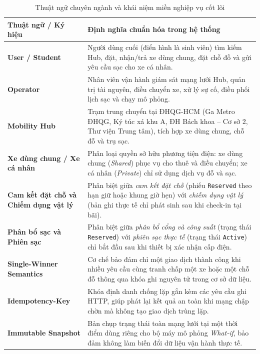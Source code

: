 \begin{table}[H]
\centering\small
\caption{Thuật ngữ chuyên ngành và khái niệm miền nghiệp vụ cốt lõi}
\label{tab:glossary}
\begin{tabularx}{\textwidth}{>{\raggedright\arraybackslash}p{4.2cm} >{\raggedright\arraybackslash}X}
\toprule
\textbf{Thuật ngữ / Ký hiệu} & \textbf{Định nghĩa chuẩn hóa trong hệ thống} \\
\midrule
\textbf{User / Student} & Người dùng cuối (điển hình là sinh viên) tìm kiếm Hub, đặt, nhận/trả xe dùng chung, đặt chỗ đỗ và gửi yêu cầu sạc cho xe cá nhân. \\
\addlinespace[3pt]
\textbf{Operator} & Nhân viên vận hành giám sát mạng lưới Hub, quản trị tài nguyên, điều chuyển xe, xử lý sự cố, điều phối lịch sạc và chạy mô phỏng. \\
\addlinespace[3pt]
\textbf{Mobility Hub} & Trạm trung chuyển tại ĐHQG-HCM (Ga Metro ĐHQG, Ký túc xá khu A, ĐH Bách khoa -- Cơ sở 2, Thư viện Trung tâm), tích hợp xe dùng chung, chỗ đỗ và trụ sạc. \\
\addlinespace[3pt]
\textbf{Xe dùng chung / Xe cá nhân} & Phân loại quyền sở hữu phương tiện điện: xe dùng chung (\textit{Shared}) phục vụ cho thuê và điều chuyển; xe cá nhân (\textit{Private}) chỉ sử dụng dịch vụ đỗ và sạc. \\
\addlinespace[3pt]
\textbf{Cam kết đặt chỗ và Chiếm dụng vật lý} & Phân biệt giữa \textit{cam kết đặt chỗ} (phiếu \texttt{Reserved} theo hạn giữ hoặc khung giờ hẹn) với \textit{chiếm dụng vật lý} (bản ghi thực tế chỉ phát sinh sau khi check-in tại bãi). \\
\addlinespace[3pt]
\textbf{Phân bổ sạc và Phiên sạc} & Phân biệt giữa \textit{phân bổ cổng và công suất} (trạng thái \texttt{Reserved}) với \textit{phiên sạc thực tế} (trạng thái \texttt{Active}) chỉ bắt đầu sau khi thiết bị xác nhận cấp điện. \\
\addlinespace[3pt]
\textbf{Single-Winner Semantics} & Cơ chế bảo đảm chỉ một giao dịch thành công khi nhiều yêu cầu cùng tranh chấp một xe hoặc một chỗ đỗ thông qua khóa ghi nguyên tử trong cơ sở dữ liệu. \\
\addlinespace[3pt]
\textbf{Idempotency-Key} & Khóa định danh chống lặp gắn kèm các yêu cầu ghi HTTP, giúp phát lại kết quả an toàn khi mạng chập chờn mà không tạo giao dịch trùng lặp. \\
\addlinespace[3pt]
\textbf{Immutable Snapshot} & Bản chụp trạng thái toàn mạng lưới tại một thời điểm dùng riêng cho bộ máy mô phỏng \textit{What-if}, bảo đảm không làm biến đổi dữ liệu vận hành thực tế. \\
\bottomrule
\end{tabularx}
\end{table}
